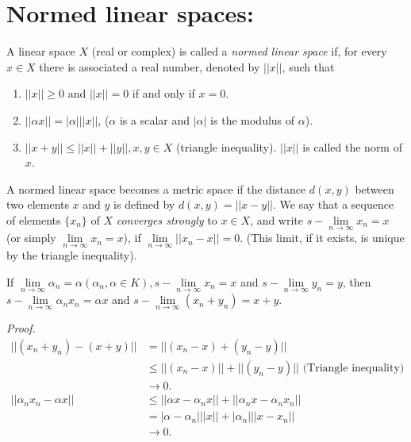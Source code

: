 \section{Normed linear spaces:}\label{chap1:sec2}
\pageoriginale

\begin{defi*}%
 A linear space $X$ (real or complex) is called a {\em normed linear
  space} if, for every $x \in X$ there is associated a real number,
 denoted by $|| x ||$, such that 
 \begin{enumerate}[\rm i)]
 \item $|| x|| \ge 0$ and $|| x || = 0$ if and only if $x = 0$.
 \item $|| \alpha x|| = |\alpha| || x||$, ($\alpha$ is a scalar and
  $|\alpha|$ is the modulus of $\alpha$). 
 \item $|| x + y|| \le || x|| + || y||, x, y \in X$ (triangle
  inequality). $|| x||$ is called the norm of $x$. 
 \end{enumerate}
\end{defi*}

A normed linear space becomes a metric space if the distance $d(x, y)$
between two elements $x$ and $y$ is defined by $d(x, y) = || x -
y||$. We say that a sequence of elements $\{x_n\}$ of $X$
\textit{converges strongly} to $x \in X$, and write $s-\lim\limits_{n
 \to \infty} x_n = x$ (or simply $\lim\limits_{n \to \infty} x_n =
x$), if $ \lim\limits_{n \to \infty} ||x_n - x || = 0$. (This limit,
if it exists, is unique by the triangle inequality). 

\begin{prop*}%
 If $\lim\limits_{n \to \infty} \alpha_n = \alpha (\alpha_n, \alpha
 \in K), s- \lim\limits_{n \to \infty} x_n = x$ and $s-\lim\limits_{n
  \to \infty} y_n = y$, then $s-\lim\limits_{n \to \infty} \alpha_n
 x_n = \alpha x$ and $s- \lim\limits_{n \to \infty} (x_n + y_n) = x +
 y$. 
\end{prop*}

\noindent \textit{Proof.}
 \begin{align*}
  ||(x_n + y_n) - (x+y)|| & = || (x_n - x) + (y_n - y)||\\ 
  & \le || (x_n -
  x) || + || (y_n - y)|| \text{ (Triangle inequality) }\\ 
  & \to 0.\\
  || \alpha_n x_n - \alpha x|| & \le || \alpha x - \alpha_n x|| + ||
  \alpha_n x - \alpha_n x_n||\\ 
  & = |\alpha -\alpha_n| || x || + |
  \alpha_n | ||x -x_n||\\ 
  & \to 0. \tag*{$\Box$}
 \end{align*}

